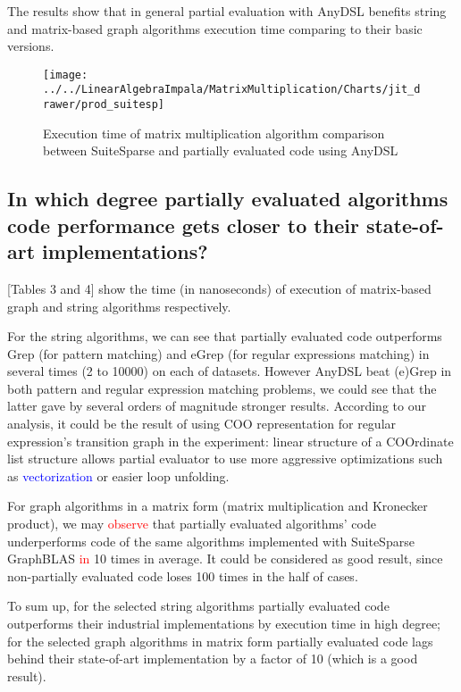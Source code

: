 \documentclass[conference]{IEEEtran}
\begin{document}
The results show that in general partial evaluation with AnyDSL benefits string and matrix-based graph algorithms execution time comparing to their basic versions.

\begin{figure}[H]
	\centering
	\texttt{[image: ../../LinearAlgebraImpala/MatrixMultiplication/Charts/jit\_drawer/prod\_suitesp]}
	\caption{Execution time of matrix multiplication algorithm comparison between SuiteSparse and partially evaluated code using AnyDSL}
\end{figure}

\begin{figure}
	\centering
\end{figure}

\subsection{In which degree partially evaluated algorithms code performance gets closer to their state-of-art implementations?}

[Tables 3 and 4] show the time (in nanoseconds) of execution of matrix-based graph and string algorithms respectively. 

For the string algorithms, we can see that partially evaluated code outperforms Grep (for pattern matching) and eGrep (for regular expressions matching) in several times (2 to 10000) on each of datasets. However AnyDSL beat (e)Grep in both pattern and regular expression matching problems, we could see that the latter gave by several orders of magnitude stronger results. According to our analysis, it could be the result of using COO representation for regular expression's transition graph in the experiment: linear structure of a COOrdinate list structure allows partial evaluator to use more aggressive optimizations such as \textcolor{blue}{vectorization} or easier loop unfolding.

For graph algorithms in a matrix form (matrix multiplication and Kronecker product), we may \textcolor{red}{observe} that partially evaluated algorithms' code underperforms code of the same algorithms implemented with SuiteSparse GraphBLAS \textcolor{red}{in} 10 times in average. It could be considered as good result, since non-partially evaluated code loses 100 times in the half of cases.

To sum up, for the selected string algorithms partially evaluated code outperforms their industrial implementations by execution time in high degree; for the selected graph algorithms in matrix form partially evaluated code lags behind their state-of-art implementation by a factor of 10 (which is a good result).
\end{document}
